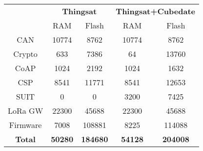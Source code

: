 \documentclass{standalone}
\begin{document}
\begin{tabular}{ccccc}
\hline
               & \multicolumn{2}{c}{\textbf{Thingsat}} & \multicolumn{2}{c}{\textbf{Thingsat+Cubedate}} \\
               & RAM               & Flash             & RAM               & Flash             \\ \hline
CAN            & 10774             & 8762              & 10774             & 8762              \\
Crypto         & 633               & 7386              & 64                & 13760             \\
CoAP           & 1024              & 2192              & 1024              & 1632              \\
CSP            & 8541              & 11771             & 8541              & 12653             \\
SUIT           & 0                 & 0                 & 3200              & 7425              \\
LoRa GW        & 22300             & 45688             & 22300             & 45688             \\
Firmware       & 7008              & 108881            & 8225              & 114088            \\ \hline
\textbf{Total} & \textbf{50280}    & \textbf{184680}   & \textbf{54128}    & \textbf{204008}   \\ \hline
\end{tabular}%
\end{document}
